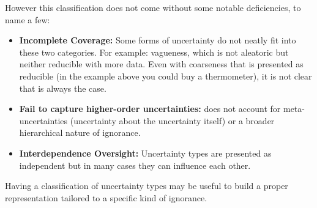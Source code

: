 However this classification does not come without some notable deficiencies, to name a few:

\begin{itemize}
    \item \textbf{Incomplete Coverage:} Some forms of uncertainty do not neatly fit into these two categories. For example: vagueness, which is not aleatoric but neither reducible with more data. Even with coarseness that is presented as reducible (in the example above you could buy a thermometer), it is not clear that is always the case.
    \item \textbf{Fail to capture higher-order uncertainties:} does not account for meta-uncertainties (uncertainty about the uncertainty itself) or a broader hierarchical nature of ignorance.
    \item \textbf{Interdependence Oversight:} Uncertainty types are presented as independent but in many cases they can influence each other.
\end{itemize}

Having a classification of uncertainty types may be useful to build a proper representation tailored to a specific kind of ignorance.